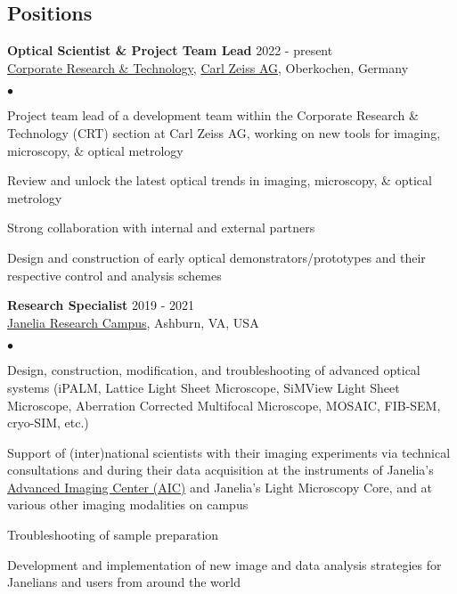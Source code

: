 \documentclass[margin,line]{res}
\newenvironment{list2}{
  \begin{list}{$\bullet$}{%
      \setlength{\itemsep}{0in}
      \setlength{\parsep}{0in} \setlength{\parskip}{0in}
      \setlength{\topsep}{0in} \setlength{\partopsep}{0in} 
      \setlength{\leftmargin}{0.2in}}}{\end{list}}
\begin{document}
\begin{resume}

\section{\sc Positions}
{\bf Optical Scientist \& Project Team Lead} \hfill {2022 - present}\\
\href{https://www.zeiss.com/corporate/int/careers/research-development-at-zeiss.html}{Corporate Research \& Technology}, \href{https://www.zeiss.de/}{Carl Zeiss AG}, Oberkochen, Germany\\
 \vspace*{-2mm}
\begin{list2}
\vspace*{-1mm}
\item Project team lead of a development team within the Corporate Research \& Technology (CRT) section at Carl Zeiss AG, working on new tools for imaging, microscopy, \& optical metrology
\item Review and unlock the latest optical trends in imaging, microscopy, \& optical metrology
\item Strong collaboration with internal and external partners 
\item Design and construction of early optical demonstrators/prototypes and their respective control and analysis schemes
\end{list2}
{\bf Research Specialist} \hfill {2019 - 2021}\\
\href{https://www.janelia.org/}{Janelia Research Campus}, Ashburn, VA, USA\\
 \vspace*{-2mm}
\begin{list2}
\vspace*{-1mm}
\item Design, construction, modification, and troubleshooting of advanced optical systems (iPALM, Lattice Light Sheet Microscope, SiMView Light Sheet Microscope, Aberration Corrected Multifocal Microscope, MOSAIC, FIB-SEM, cryo-SIM, etc.)
\item Support of (inter)national scientists with their imaging experiments via technical consultations and during their data acquisition at the instruments of Janelia's \href{https://www.aicjanelia.org/}{Advanced Imaging Center (AIC)} and Janelia's Light Microscopy Core, and at various other imaging modalities on campus
\item Troubleshooting of sample preparation
\item Development and implementation of new image and data analysis strategies for Janelians and users from around the world

\end{list2}
\end{resume}
\end{document}
